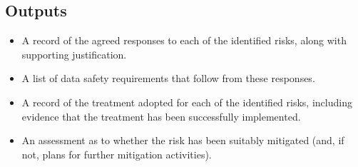 \subsection{Outputs}
\begin{itemize}
	\item A record of the agreed \glspl{response} to each of the identified risks, along with supporting justification.
	\item A list of \glspl{data safety requirement} that follow from these \glspl{response}.
	\item A record of the \gls{treatment} adopted for each of the identified risks, including evidence that the \gls{treatment} has been successfully implemented.
	\item An assessment as to whether the risk has been suitably mitigated (and, if not, plans for further \gls{mitigation} activities).
\end{itemize}

